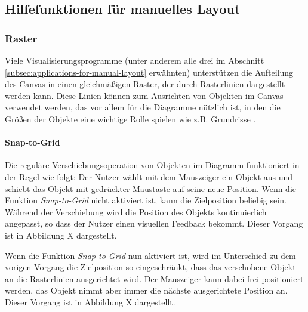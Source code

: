 \subsection{Hilfefunktionen für manuelles Layout}
\label{subsec:help-functions-for-manual-layout}

\subsubsection{Raster}
\label{subsubsec:grid}

Viele Visualisierungsprogramme (unter anderem alle drei im Abschnitt \ref{subsec:applications-for-manual-layout} erwähnten) unterstützen die Aufteilung des Canvas in einen gleichmäßigen Raster, der durch Rasterlinien dargestellt werden kann. Diese Linien können zum Ausrichten von Objekten im Canvas verwendet werden, das vor allem für die Diagramme nützlich ist, in den die Größen der Objekte eine wichtige Rolle spielen wie z.B. Grundrisse \cite{08OmniGraffle, Olsen10OmniGraffle, 11Keynote, 14Visual}.

\paragraph{Snap-to-Grid}

Die reguläre Verschiebungsoperation von Objekten im Diagramm funktioniert in der Regel wie folgt: Der Nutzer wählt mit dem Mauszeiger ein Objekt aus und schiebt das Objekt mit gedrückter Maustaste auf seine neue Position. Wenn die Funktion \textit{Snap-to-Grid} nicht aktiviert ist, kann die Zielposition beliebig sein. Während der Verschiebung wird die Position des Objekts kontinuierlich angepasst, so dass der Nutzer einen visuellen Feedback bekommt. Dieser Vorgang ist in Abbildung X dargestellt.


Wenn die Funktion \textit{Snap-to-Grid} nun aktiviert ist, wird im Unterschied zu dem vorigen Vorgang die Zielposition so eingeschränkt, dass das verschobene Objekt an die Rasterlinien ausgerichtet wird. Der Mauszeiger kann dabei frei positioniert werden, das Objekt nimmt aber immer die nächste ausgerichtete Position an. Dieser Vorgang ist in Abbildung X dargestellt.


